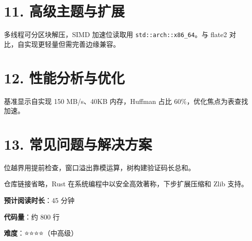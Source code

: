 \chapter{11. 高级主题与扩展}
多线程可分区块解压，SIMD 加速位读取用 \texttt{std::arch::x86\_{}64}。与 flate2 对比，自实现更轻量但需完善边缘兼容。\par
\chapter{12. 性能分析与优化}
基准显示自实现 150 MB/s、40KB 内存，Huffman 占比 60\%{}，优化焦点为表查找加速。\par
\chapter{13. 常见问题与解决方案}
位越界用提前检查，窗口溢出靠模运算，树构建验证码长总和。\par
仓库链接省略，Rust 在系统编程中以安全高效著称，下步扩展压缩和 Zlib 支持。\par
\textbf{预计阅读时长}：45 分钟\par
\textbf{代码量}：约 800 行\par
\textbf{难度}：⭐⭐⭐⭐（中高级）\par
